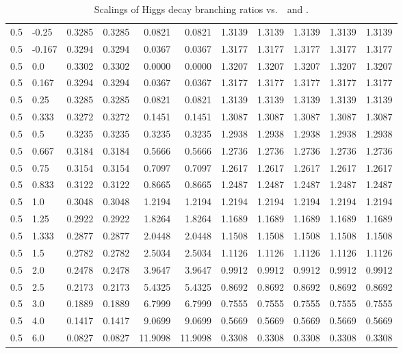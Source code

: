 \begin{table}[h!]
\begin{tabular}{ll rrrrrrrrr}
   0.5  & -0.25  & 0.3285 & 0.3285 & 0.0821  & 0.0821  & 1.3139 & 1.3139 & 1.3139 & 1.3139 & 1.3139 \\
   0.5  & -0.167 & 0.3294 & 0.3294 & 0.0367  & 0.0367  & 1.3177 & 1.3177 & 1.3177 & 1.3177 & 1.3177 \\
   0.5  & 0.0    & 0.3302 & 0.3302 & 0.0000  & 0.0000  & 1.3207 & 1.3207 & 1.3207 & 1.3207 & 1.3207 \\
   0.5  & 0.167  & 0.3294 & 0.3294 & 0.0367  & 0.0367  & 1.3177 & 1.3177 & 1.3177 & 1.3177 & 1.3177 \\
   0.5  & 0.25   & 0.3285 & 0.3285 & 0.0821  & 0.0821  & 1.3139 & 1.3139 & 1.3139 & 1.3139 & 1.3139 \\
   0.5  & 0.333  & 0.3272 & 0.3272 & 0.1451  & 0.1451  & 1.3087 & 1.3087 & 1.3087 & 1.3087 & 1.3087 \\
   0.5  & 0.5    & 0.3235 & 0.3235 & 0.3235  & 0.3235  & 1.2938 & 1.2938 & 1.2938 & 1.2938 & 1.2938 \\
   0.5  & 0.667  & 0.3184 & 0.3184 & 0.5666  & 0.5666  & 1.2736 & 1.2736 & 1.2736 & 1.2736 & 1.2736 \\
   0.5  & 0.75   & 0.3154 & 0.3154 & 0.7097  & 0.7097  & 1.2617 & 1.2617 & 1.2617 & 1.2617 & 1.2617 \\
   0.5  & 0.833  & 0.3122 & 0.3122 & 0.8665  & 0.8665  & 1.2487 & 1.2487 & 1.2487 & 1.2487 & 1.2487 \\
   0.5  & 1.0    & 0.3048 & 0.3048 & 1.2194  & 1.2194  & 1.2194 & 1.2194 & 1.2194 & 1.2194 & 1.2194 \\
   0.5  & 1.25   & 0.2922 & 0.2922 & 1.8264  & 1.8264  & 1.1689 & 1.1689 & 1.1689 & 1.1689 & 1.1689 \\
   0.5  & 1.333  & 0.2877 & 0.2877 & 2.0448  & 2.0448  & 1.1508 & 1.1508 & 1.1508 & 1.1508 & 1.1508 \\
   0.5  & 1.5    & 0.2782 & 0.2782 & 2.5034  & 2.5034  & 1.1126 & 1.1126 & 1.1126 & 1.1126 & 1.1126 \\
   0.5  & 2.0    & 0.2478 & 0.2478 & 3.9647  & 3.9647  & 0.9912 & 0.9912 & 0.9912 & 0.9912 & 0.9912 \\
   0.5  & 2.5    & 0.2173 & 0.2173 & 5.4325  & 5.4325  & 0.8692 & 0.8692 & 0.8692 & 0.8692 & 0.8692 \\
   0.5  & 3.0    & 0.1889 & 0.1889 & 6.7999  & 6.7999  & 0.7555 & 0.7555 & 0.7555 & 0.7555 & 0.7555 \\
   0.5  & 4.0    & 0.1417 & 0.1417 & 9.0699  & 9.0699  & 0.5669 & 0.5669 & 0.5669 & 0.5669 & 0.5669 \\
   0.5  & 6.0    & 0.0827 & 0.0827 & 11.9098 & 11.9098 & 0.3308 & 0.3308 & 0.3308 & 0.3308 & 0.3308 \\\hline
    \end{tabular}
    \caption[Scalings of Higgs decay branching ratios vs.\ \Ct\ and \ ]{Scalings of Higgs decay branching ratios vs.\ \Ct\ and .}\label{tab:brscalingK6_0p5}
 \end{table}

